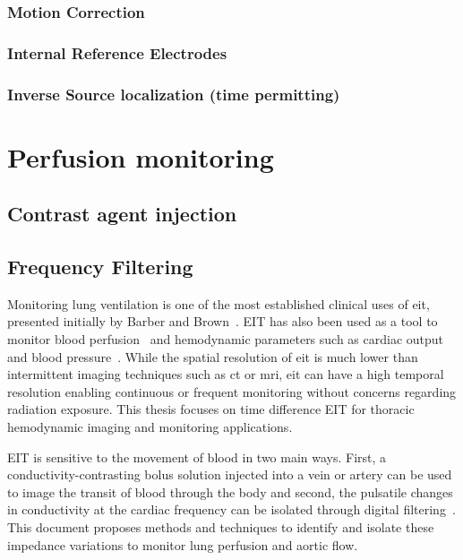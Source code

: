 \subsubsection{Motion Correction} \label{sec:motion_correction}
\subsubsection{Internal Reference Electrodes}
\subsubsection{Inverse Source localization (time permitting)}










\section{Perfusion monitoring}
\subsection{Contrast agent injection}
\subsection{Frequency Filtering}


Monitoring lung ventilation is one of the most
established clinical uses of 
\acrshort{eit}, presented initially by Barber and Brown~\parencite{Barber1984}.
EIT has also been used as a tool to monitor blood 
perfusion~\parencite{Brown1992} and hemodynamic parameters such as 
cardiac output~\parencite{Braun2018} and blood pressure~\parencite{Sola2011,Proenca2017}. 
While the spatial resolution of \acrshort{eit} is much lower than 
intermittent imaging techniques such as \acrfull{ct} or \acrfull{mri},
\acrshort{eit} can have a high temporal resolution enabling continuous or frequent 
monitoring without concerns regarding radiation exposure.
This thesis focuses on time difference EIT for thoracic hemodynamic imaging and monitoring applications. 

EIT is sensitive to the movement of blood in two main ways. First, a conductivity-contrasting 
bolus solution injected into a vein or artery can be used to image the transit of blood through the body
and second, the pulsatile changes in conductivity at the cardiac frequency can be isolated 
through digital filtering~\parencite{Leathard1994}.
This document proposes methods and techniques to identify and isolate these impedance variations
to monitor lung perfusion and 
aortic flow.

